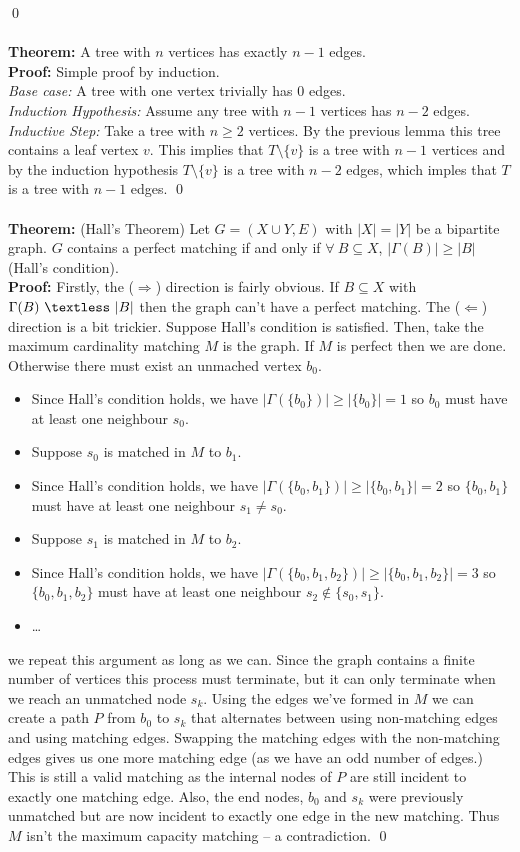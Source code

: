 \documentclass{article}
\newcommand{\ti}[1]{\textit{#1}}
\newcommand{\lt}{\textless}
\newcommand{\imply}{\Rightarrow}
\newcommand{\Ga}{\Gamma}
\newcommand{\thm}{\textbf{Theorem: }}
\newcommand{\proo}{\textbf{Proof: }}
\begin{document}
\qed\\\\
\thm A tree with $n$ vertices has exactly $n-1$ edges.\\
\proo Simple proof by induction.\\
\ti{Base case:} A tree with one vertex trivially has 0 edges.\\
\ti{Induction Hypothesis:} Assume any tree with $n-1$ vertices has $n-2$ edges.\\
\ti{Inductive Step:} Take a tree with $n \geq 2$ vertices. By the previous lemma this tree contains a leaf vertex $v$. This implies that $T\setminus\{v\}$ is a tree with $n-1$ vertices and by the induction hypothesis $T \setminus \{v\}$ is a tree with $n-2$ edges, which imples that $T$ is a tree with $n-1$ edges.
\qed\\\\
\thm (Hall's Theorem) Let $G = (X \cup Y, E)$ with $|X| = |Y|$ be a bipartite graph. $G$ contains a perfect matching if and only if $\forall\ B \subseteq X$, $|\Ga(B)| \geq |B|$ (Hall's condition).\\
\proo Firstly, the ($\imply$) direction is fairly obvious. If $B \subseteq X$ with $\Ga(B)\ \lt\ |B|$ then the graph can't have a perfect matching. The ($\Leftarrow$) direction is a bit trickier. Suppose Hall's condition is satisfied. Then, take the maximum cardinality matching $M$ is the graph. If $M$ is perfect then we are done. Otherwise there must exist an unmached vertex $b_0$.
\begin{itemize}
	\item Since Hall's condition holds, we have $|\Ga(\{b_0\})| \geq |\{b_{0}\}| = 1$ so $b_0$ must have at least one neighbour $s_0$.
	\item Suppose $s_0$ is matched in $M$ to $b_1$.
	\item Since Hall's condition holds, we have $|\Ga(\{b_0, b_1\})| \geq |\{b_{0}, b_1\}| = 2$ so $\{b_0, b_1\}$ must have at least one neighbour $s_1 \neq s_0$.
	\item Suppose $s_1$ is matched in $M$ to $b_2$.
	\item Since Hall's condition holds, we have $|\Ga(\{b_0, b_1, b_2\})| \geq |\{b_{0}, b_1, b_2\}| = 3$ so $\{b_0, b_1, b_2\}$ must have at least one neighbour $s_2 \notin \{s_0, s_1\}$.
	\item \dots
\end{itemize}
we repeat this argument as long as we can. Since the graph contains a finite number of vertices this process must terminate, but it can only terminate when we reach an unmatched node $s_k$. Using the edges we've formed in $M$ we can create a path $P$ from $b_0$ to $s_k$ that alternates between using non-matching edges and using matching edges. Swapping the matching edges with the non-matching edges gives us one more matching edge (as we have an odd number of edges.) This is still a valid matching as the internal nodes of $P$ are still incident to exactly one matching edge. Also, the end nodes, $b_0$ and $s_k$ were previously unmatched but are now incident to exactly one edge in the new matching. Thus $M$ isn't the maximum capacity matching -- a contradiction.
\qed
\end{document}
